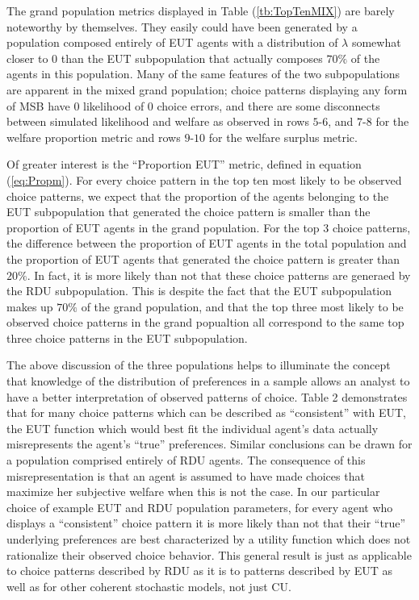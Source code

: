 \documentclass[../main.tex]{subfiles}
\begin{document}
The grand population metrics displayed in Table (\ref{tb:TopTenMIX}) are barely noteworthy by themselves.
They easily could have been generated by a population composed entirely of EUT agents with a distribution of $\lambda$ somewhat closer to $0$ than the EUT subpopulation that actually composes $70\%$ of the agents in this population.
Many of the same features of the two subpopulations are apparent in the mixed grand population;
choice patterns displaying any form of MSB have $0$ likelihood of $0$ choice errors, and there are some disconnects between simulated likelihood and welfare as observed in rows $5$-$6$, and $7$-$8$ for the welfare proportion metric and rows $9$-$10$ for the welfare surplus metric.

Of greater interest is the \enquote{Proportion EUT} metric, defined in equation (\ref{eq:Propm}).
For every choice pattern in the top ten most likely to be observed choice patterns, we expect that the proportion of the agents belonging to the EUT subpopulation that generated the choice pattern is smaller than the proportion of EUT agents in the grand population.
For the top 3 choice patterns, the difference between the proportion of EUT agents in the total population and the proportion of EUT agents that generated the choice pattern is greater than $20\%$.
In fact, it is more likely than not that these choice patterns are generaed by the RDU subpopulation.
This is despite the fact that the EUT subpopulation makes up $70\%$ of the grand population, and that the top three most likely to be observed choice patterns in the grand popualtion all correspond to the same top three choice patterns in the EUT subpopulation.

The above discussion of the three populations helps to illuminate the concept that knowledge of the distribution of preferences in a sample allows an analyst to have a better interpretation of observed patterns of choice.
Table 2 demonstrates that for many choice patterns which can be described as \enquote{consistent} with EUT, the EUT function which would best fit the individual agent's data actually misrepresents the agent's \enquote{true} preferences.
Similar conclusions can be drawn for a population comprised entirely of RDU agents.
The consequence of this misrepresentation is that an agent is assumed to have made choices that maximize her subjective welfare when this is not the case.
In our particular choice of example EUT and RDU population parameters, for every agent who displays a \enquote{consistent} choice pattern it is more likely than not that their \enquote{true} underlying preferences are best characterized by a utility function which does not rationalize their observed choice behavior.
This general result is just as applicable to choice patterns described by RDU as it is to patterns described by EUT as well as for other coherent stochastic models, not just CU.
\end{document}
